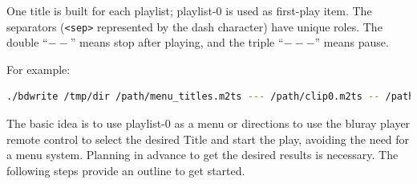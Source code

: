 One title is built for each playlist; playlist-0 is used as first-play item.  The separators (\texttt{<sep>} represented by the dash character) have unique roles.  The double “$--$” means stop after playing, and the triple “$---$” means pause.

For example:

\begin{lstlisting}[language=bash]
./bdwrite /tmp/dir /path/menu_titles.m2ts --- /path/clip0.m2ts -- /path/clip1.m2ts -- /path/clip2.m2ts
\end{lstlisting}

The basic idea is to use playlist-0 as a menu or directions to use the bluray player remote control to select the desired Title and start the play, avoiding the need for a menu system.  Planning in advance to get the desired results is necessary.  The following steps provide an outline to get started.

